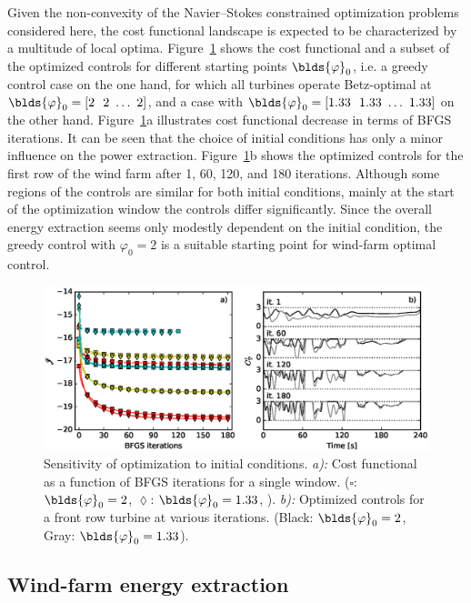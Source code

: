 Given the non-convexity of the Navier--Stokes constrained optimization problems considered here, the cost functional landscape is expected to be characterized by a multitude of local optima. Figure~\ref{fig:initial_conditions} shows the cost functional and a subset of the optimized controls for different starting points $\blds{\varphi}_0$, i.e. a greedy control case on the one hand, for which all turbines operate Betz-optimal at $\blds{\varphi}_0 = [2 \ \ 2 \ \dots \ 2]$, and a case with $\blds{\varphi}_0 = [1.33 \ \ 1.33 \ \dots \ 1.33]$ on the other hand. Figure~\ref{fig:initial_conditions}a illustrates cost functional decrease in terms of BFGS iterations. It can be seen that the choice of initial conditions has only a minor influence on the power extraction. Figure~\ref{fig:initial_conditions}b shows the optimized controls for the first row of the wind farm after 1, 60, 120, and 180 iterations. Although some regions of the controls are similar for both initial conditions, mainly at the start of the optimization window the controls differ significantly. Since the overall energy extraction seems only modestly dependent on the initial condition, the greedy control with $\varphi_0 = 2$ is a suitable starting point for wind-farm optimal control.

\begin{figure}[ht!]
	\centering
	\includegraphics[width=\linewidth]{chapters/philtrans_torque/figure13.eps}	
	\caption{Sensitivity of optimization to initial conditions. \emph{a):} Cost functional as a function of BFGS iterations for a single window. ($\square$: $\blds{\varphi}_0 = 2$, $\lozenge$: $\blds{\varphi}_0 = 1.33$, \legendnoref ). \emph{b):} Optimized controls for a front row turbine at various iterations. (Black: $\blds{\varphi}_0 = 2$, Gray: $\blds{\varphi}_0 = 1.33$). \label{fig:initial_conditions}} 
\end{figure}


\subsection{Wind-farm energy extraction}\label{sec:opt_ind_energy}

